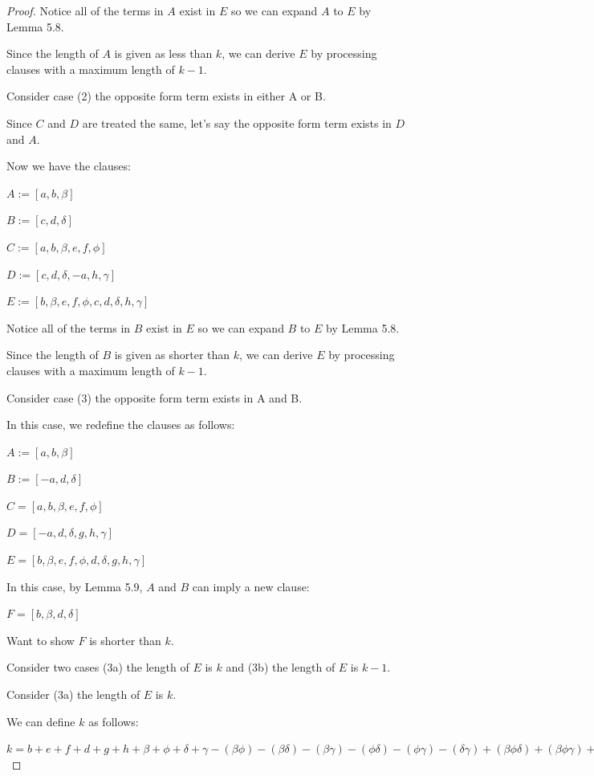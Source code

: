 \documentclass[manuscript]{acmart}
\begin{document}
\begin{proof}
        Notice all of the terms in $A$ exist in $E$ so we can expand $A$ to $E$ by Lemma 5.8.

        Since the length of $A$ is given as less than $k$, we can derive $E$ by processing clauses with a maximum length of $k - 1$.

        Consider case (2) the opposite form term exists in either A or B.

        Since $C$ and $D$ are treated the same, let's say the opposite form term exists in $D$ and $A$.
        
        Now we have the clauses:

        $A := [a, b, \beta]$

        $B := [c, d, \delta]$

        $C := [a, b, \beta, e, f, \phi]$

        $D := [c, d, \delta, -a, h, \gamma]$

        $E := [b, \beta, e, f, \phi, c, d, \delta, h, \gamma]$

        Notice all of the terms in $B$ exist in $E$ so we can expand $B$ to $E$ by Lemma 5.8.

        Since the length of $B$ is given as shorter than $k$, we can derive $E$ by processing clauses with a maximum length of $k - 1$.

        Consider case (3) the opposite form term exists in A and B.

        In this case, we redefine the clauses as follows:

        $A := [a, b, \beta]$

        $B := [-a, d, \delta]$

        $C = [a, b, \beta, e, f, \phi]$

        $D = [-a, d, \delta, g, h, \gamma]$

        $E = [b, \beta, e, f, \phi, d, \delta, g, h, \gamma]$

        In this case, by Lemma 5.9, $A$ and $B$ can imply a new clause:

        $F = [b, \beta, d, \delta]$

        Want to show $F$ is shorter than $k$.

        Consider two cases (3a) the length of $E$ is $k$ and (3b) the length of $E$ is $k-1$.

        Consider (3a) the length of $E$ is $k$.

        We can define $k$ as follows:

        $k = b + e + f + d + g + h 
            + \beta + \phi + \delta + \gamma
            - (\beta \phi) - (\beta \delta) - (\beta \gamma) - (\phi \delta) - (\phi \gamma) - (\delta \gamma)
            + (\beta \phi \delta) + (\beta \phi \gamma) + (\phi \delta \gamma)
            - (\beta \phi \delta \gamma)
            $


\end{proof}
\end{document}

